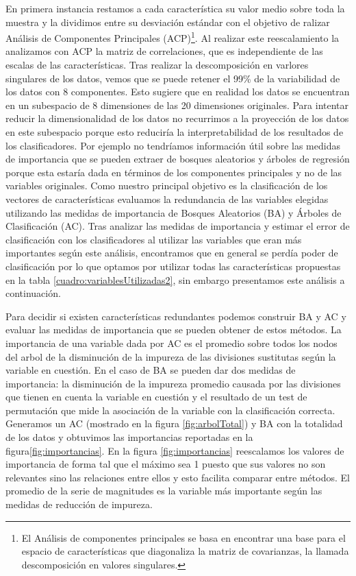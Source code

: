 \documentclass[letterpaper,12pt]{book}
\begin{document}
En primera instancia restamos a cada característica su valor medio sobre toda la muestra y la dividimos entre su desviación estándar con el objetivo de ralizar Análisis de Componentes Principales (ACP)\footnote{El Análisis de componentes principales se basa en encontrar una base para el espacio de características que diagonaliza la matriz de covarianzas, la llamada descomposición en valores singulares.}. Al realizar este reescalamiento la analizamos con ACP la matriz de correlaciones, que es independiente de las escalas de las características. Tras realizar la descomposición en varlores singulares de los datos, vemos que se puede retener el 99\% de la variabilidad de los datos con 8 componentes. Esto sugiere que en realidad los datos se encuentran en un subespacio de 8 dimensiones de las 20 dimensiones originales. Para intentar reducir la dimensionalidad de los datos no recurrimos a la proyección de los datos en este subespacio porque esto reduciría la interpretabilidad de los resultados de los clasificadores. Por ejemplo no tendríamos información útil sobre las medidas de importancia que se pueden extraer de bosques aleatorios y árboles de regresión porque esta estaría dada en términos de los componentes principales y no de las variables originales. Como nuestro principal objetivo es la clasificación de los vectores de características evaluamos la redundancia de las variables elegidas utilizando las medidas de importancia de Bosques  Aleatorios (BA) y Árboles de Clasificación (AC). Tras analizar las medidas de importancia y estimar el error de clasificación con los clasificadores al utilizar las variables que eran más importantes según este análisis, encontramos que en general se perdía poder de clasificación por lo que optamos por utilizar todas las características propuestas en la tabla  \ref{cuadro:variablesUtilizadas2}, sin embargo presentamos este análisis a continuación.

Para decidir si existen características redundantes podemos construir BA y AC y evaluar las medidas de importancia que se pueden obtener de estos métodos. La importancia de una variable dada por AC es el promedio sobre todos los nodos del arbol de la  disminución de la impureza de las divisiones sustitutas según la variable en cuestión. En el caso de BA se pueden dar dos medidas de importancia: la disminución de la impureza promedio causada por las divisiones que tienen en cuenta la variable en cuestión  y el resultado de un test de permutación que mide la asociación de la variable con la clasificación correcta. Generamos un AC (mostrado en la figura \ref{fig:arbolTotal}) y BA con la totalidad de los datos y obtuvimos las importancias reportadas en la figura\ref{fig:importancias}.  En la figura \ref{fig:importancias} reescalamos los valores de importancia de forma tal que el máximo sea 1 puesto que sus valores no son relevantes sino las relaciones entre ellos y esto facilita comparar entre métodos. El promedio de la serie de magnitudes es la variable más importante según las medidas de reducción de impureza.
 
\end{document}
